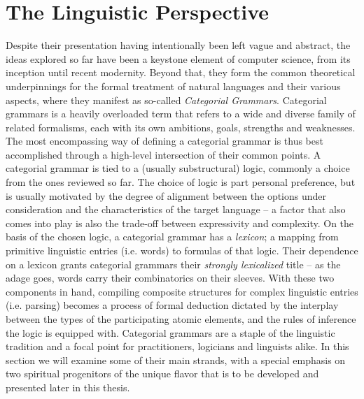 \section{The Linguistic Perspective}
Despite their presentation having intentionally been left vague and abstract, the ideas explored so far have been a keystone element of computer science, from its inception until recent modernity.
Beyond that, they form the common theoretical underpinnings for the formal treatment of natural languages and their various aspects, where they manifest as so-called \textit{Categorial Grammars}.
Categorial grammars is a heavily overloaded term that refers to a wide and diverse family of related formalisms, each with its own ambitions, goals, strengths and weaknesses.
The most encompassing way of defining a categorial grammar is thus best accomplished through a high-level intersection of their common points.
A categorial grammar is tied to a (usually substructural) logic, commonly a choice from the ones reviewed so far.
The choice of logic is part personal preference, but is usually motivated by the degree of alignment between the options under consideration and the characteristics of the target language -- a factor that also comes into play is also the trade-off between expressivity and complexity.
On the basis of the chosen logic, a categorial grammar has a \textit{lexicon}; a mapping from primitive linguistic entries (i.e. words) to formulas of that logic.
Their dependence on a lexicon grants categorial grammars their \textit{strongly lexicalized} title -- as the adage goes, words carry their combinatorics on their sleeves.
With these two components in hand, compiling composite structures for complex linguistic entries (i.e. parsing) becomes a process of formal deduction dictated by the interplay between the types of the participating atomic elements, and the rules of inference the logic is equipped with.
Categorial grammars are a staple of the linguistic tradition and a focal point for practitioners, logicians and linguists alike. 
In this section we will examine some of their main strands, with a special emphasis on two spiritual progenitors of the unique flavor that is to be developed and presented later in this thesis.


